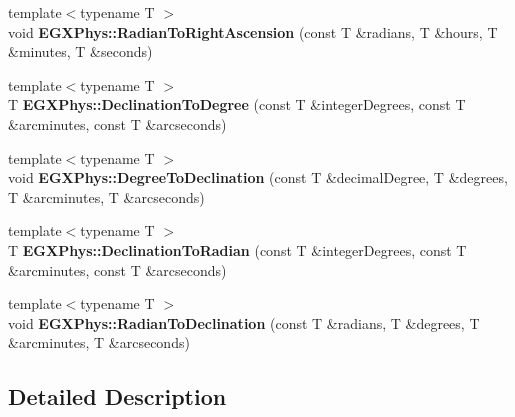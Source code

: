 \begin{DoxyCompactItemize}
\item 
\mbox{\label{group___e_g_x_phys-_right_ascension_and_declination_ga50c306a7d118d3b3c02bc3621e1cb078}} 
{\footnotesize template$<$typename T $>$ }\\void {\bfseries E\+G\+X\+Phys\+::\+Radian\+To\+Right\+Ascension} (const T \&radians, T \&hours, T \&minutes, T \&seconds)
\item 
\mbox{\label{group___e_g_x_phys-_right_ascension_and_declination_gadcadb4f709a5115a8edb18c872af9eda}} 
{\footnotesize template$<$typename T $>$ }\\T {\bfseries E\+G\+X\+Phys\+::\+Declination\+To\+Degree} (const T \&integer\+Degrees, const T \&arcminutes, const T \&arcseconds)
\item 
\mbox{\label{group___e_g_x_phys-_right_ascension_and_declination_ga4f3c37a00f59722857bcd4e6acd01865}} 
{\footnotesize template$<$typename T $>$ }\\void {\bfseries E\+G\+X\+Phys\+::\+Degree\+To\+Declination} (const T \&decimal\+Degree, T \&degrees, T \&arcminutes, T \&arcseconds)
\item 
\mbox{\label{group___e_g_x_phys-_right_ascension_and_declination_gaeddd0fbc1c695863bf2bbc2a948b9b59}} 
{\footnotesize template$<$typename T $>$ }\\T {\bfseries E\+G\+X\+Phys\+::\+Declination\+To\+Radian} (const T \&integer\+Degrees, const T \&arcminutes, const T \&arcseconds)
\item 
\mbox{\label{group___e_g_x_phys-_right_ascension_and_declination_gaa91fc4b5a4ac9e9dc94aff7b8f6f9bd1}} 
{\footnotesize template$<$typename T $>$ }\\void {\bfseries E\+G\+X\+Phys\+::\+Radian\+To\+Declination} (const T \&radians, T \&degrees, T \&arcminutes, T \&arcseconds)
\end{DoxyCompactItemize}


\subsection{Detailed Description}


